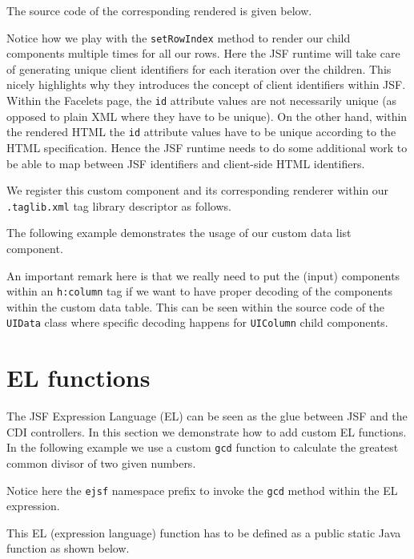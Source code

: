 The source code of the corresponding rendered is given below.

Notice how we play with the \texttt{setRowIndex} method to render our child components multiple times for all our rows.
Here the JSF runtime will take care of generating unique client identifiers for each iteration over the children.
This nicely highlights why they introduces the concept of client identifiers within JSF.
Within the Facelets page, the \texttt{id} attribute values are not necessarily unique (as opposed to plain XML where they have to be unique).
On the other hand, within the rendered HTML the \texttt{id} attribute values have to be unique according to the HTML specification.
Hence the JSF runtime needs to do some additional work to be able to map between JSF identifiers and client-side HTML identifiers.

We register this custom component and its corresponding renderer within our \texttt{.taglib\allowbreak .xml} tag library descriptor as follows.


The following example demonstrates the usage of our custom data list component.

An important remark here is that we really need to put the (input) components within an \texttt{h:column} tag if we want to have proper decoding of the components within the custom data table.
This can be seen within the source code of the \texttt{UIData} class where specific decoding happens for \texttt{UIColumn} child components.


\section{EL functions}
The JSF Expression Language (EL) can be seen as the glue between JSF and the CDI controllers.
In this section we demonstrate how to add custom EL functions.
In the following example we use a custom \texttt{gcd} function to calculate the greatest common divisor of two given numbers.

Notice here the \texttt{ejsf} namespace prefix to invoke the \texttt{gcd} method within the EL expression.

This EL (expression language) function has to be defined as a public static Java function as shown below.


